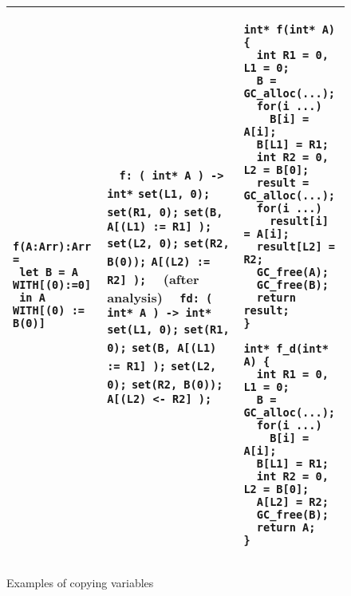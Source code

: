 \documentclass[12pt,a4paper]{article}
\newcommand{\cl}[1]{\texttt{#1}}
\begin{document}
\begin{figure}[!ht]
\begin{tabular}{|p{5.5cm}|p{5.5cm}|p{6cm}|}
\begin{lstlisting}
f(A:Arr):Arr =
 let B = A WITH[(0):=0]
 in A WITH[(0) := B(0)]
\end{lstlisting} &
\ \newline
\cl{f: ( int* A ) -> int*} \newline
\cl{set(L1, 0);} \newline
\cl{set(R1, 0);} \newline
\cl{set(B, A[(L1) := R1] );} \newline
\cl{set(L2, 0);} \newline
\cl{set(R2, B(0));} \newline
\cl{A[(L2) := R2] );} \newline
\ \newline
(after analysis) \newline
\ \newline
\cl{fd: ( int* A ) -> int*} \newline
\cl{set(L1, 0);} \newline
\cl{set(R1, 0);} \newline
\cl{set(B, A[(L1) := R1] );} \newline
\cl{set(L2, 0);} \newline
\cl{set(R2, B(0));} \newline
\cl{A[(L2) <- R2] );}
&
\begin{lstlisting}
int* f(int* A) {
  int R1 = 0, L1 = 0;
  B = GC_alloc(...);
  for(i ...)
    B[i] = A[i];
  B[L1] = R1;
  int R2 = 0, L2 = B[0];
  result = GC_alloc(...);
  for(i ...)
    result[i] = A[i];
  result[L2] = R2;
  GC_free(A);
  GC_free(B);
  return result;
}

int* f_d(int* A) {
  int R1 = 0, L1 = 0;
  B = GC_alloc(...);
  for(i ...)
    B[i] = A[i];
  B[L1] = R1;
  int R2 = 0, L2 = B[0];
  A[L2] = R2;
  GC_free(B);
  return A;
}
\end{lstlisting} \\ \hline
\end{tabular}
\caption{Examples of copying variables}
\end{figure}
\end{document}
